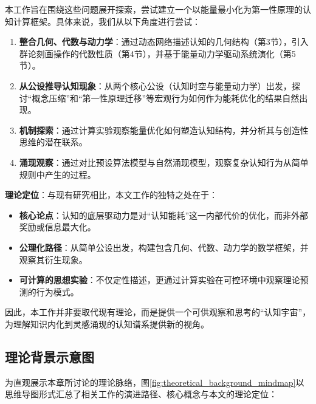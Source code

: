 \documentclass[12pt,a4paper]{article}
\begin{document}
本工作旨在围绕这些问题展开探索，尝试建立一个以能量最小化为第一性原理的认知计算框架。具体来说，我们从以下角度进行尝试：

\begin{enumerate}
\item \textbf{整合几何、代数与动力学}：通过动态网络描述认知的几何结构（第3节），引入群论刻画操作的代数性质（第4节），并基于能量动力学驱动系统演化（第5节）。
\item \textbf{从公设推导认知现象}：从两个核心公设（认知时空与能量动力学）出发，探讨“概念压缩”和“第一性原理迁移”等宏观行为如何作为能耗优化的结果自然出现。
\item \textbf{机制探索}：通过计算实验观察能量优化如何塑造认知结构，并分析其与创造性思维的潜在联系。
\item \textbf{涌现观察}：通过对比预设算法模型与自然涌现模型，观察复杂认知行为从简单规则中产生的过程。
\end{enumerate}

\textbf{理论定位}：与现有研究相比，本文工作的独特之处在于：
\begin{itemize}
\item \textbf{核心论点}：认知的底层驱动力是对“认知能耗”这一内部代价的优化，而非外部奖励或信息最大化。
\item \textbf{公理化路径}：从简单公设出发，构建包含几何、代数、动力学的数学框架，并观察其衍生现象。
\item \textbf{可计算的思想实验}：不仅定性描述，更通过计算实验在可控环境中观察理论预测的行为模式。
\end{itemize}

因此，本工作并非要取代现有理论，而是提供一个可供观察和思考的“认知宇宙”，为理解知识内化到灵感涌现的认知谱系提供新的视角。

\subsection{理论背景示意图}
\label{subsec:theoretical_background_mindmap}

为直观展示本章所讨论的理论脉络，图\ref{fig:theoretical_background_mindmap}以思维导图形式汇总了相关工作的演进路径、核心概念与本文的理论定位：
\end{document}
